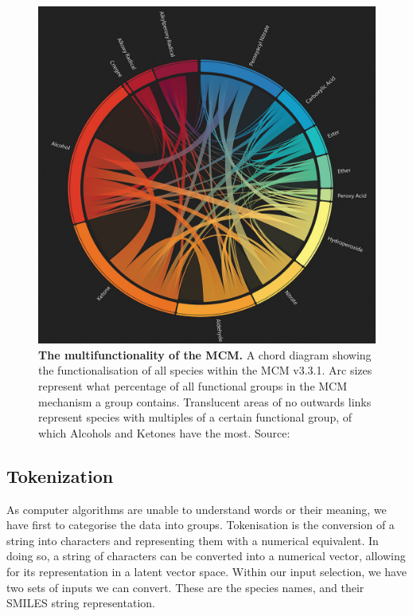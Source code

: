\begin{figure}[H]
    \centering
    \includegraphics[width=\textwidth]{4fig/coverfig.jpg}
    \caption{\textbf{The multifunctionality of the MCM.} A chord diagram showing the functionalisation of all species within the MCM v3.3.1. Arc sizes represent what percentage of all functional groups in the MCM mechanism a group contains. Translucent areas of no outwards links represent species with multiples of a certain functional group, of which Alcohols and Ketones have the most.
    Source: \citep{cover} }
    \label{fig:covermcm}
\end{figure}



\subsection{Tokenization}
As computer algorithms are unable to understand words or their meaning, we have first to categorise the data into groups. Tokenisation is the conversion of a string into characters and representing them with a numerical equivalent. In doing so, a string of characters can be converted into a numerical vector, allowing for its representation in a latent vector space.
Within our input selection, we have two sets of inputs we can convert. These are the species names, and their SMILES string representation.



